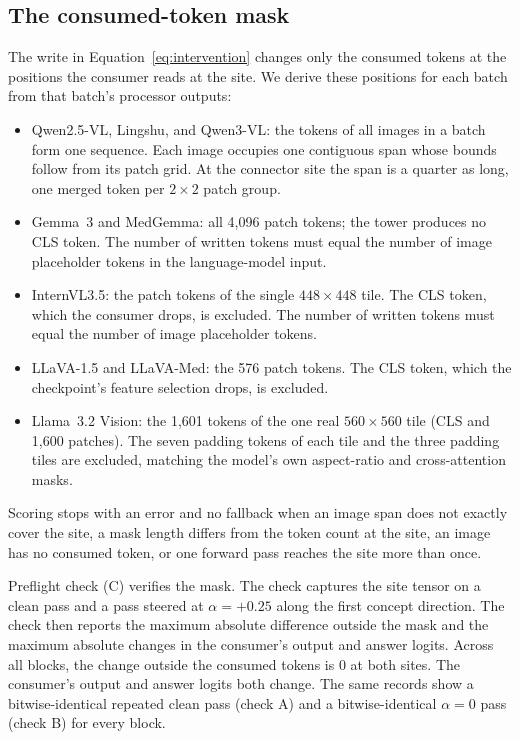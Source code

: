 \subsection{The consumed-token mask}
\label{app:repro-mask}

The write in Equation~\ref{eq:intervention} changes only the consumed tokens at the positions the consumer reads at the site. We derive these positions for each batch from that batch's processor outputs:

\begin{itemize}[leftmargin=*,itemsep=1pt,topsep=2pt]
\item Qwen2.5-VL, Lingshu, and Qwen3-VL: the tokens of all images in a batch form one sequence. Each image occupies one contiguous span whose bounds follow from its patch grid. At the connector site the span is a quarter as long, one merged token per $2\times2$ patch group.
\item Gemma~3 and MedGemma: all 4{,}096 patch tokens; the tower produces no CLS token. The number of written tokens must equal the number of image placeholder tokens in the language-model input.
\item InternVL3.5: the patch tokens of the single $448\times448$ tile. The CLS token, which the consumer drops, is excluded. The number of written tokens must equal the number of image placeholder tokens.
\item LLaVA-1.5 and LLaVA-Med: the 576 patch tokens. The CLS token, which the checkpoint's feature selection drops, is excluded.
\item Llama~3.2 Vision: the 1{,}601 tokens of the one real $560\times560$ tile (CLS and 1{,}600 patches). The seven padding tokens of each tile and the three padding tiles are excluded, matching the model's own aspect-ratio and cross-attention masks.
\end{itemize}

Scoring stops with an error and no fallback when an image span does not exactly cover the site, a mask length differs from the token count at the site, an image has no consumed token, or one forward pass reaches the site more than once.

Preflight check (C) verifies the mask. The check captures the site tensor on a clean pass and a pass steered at $\alpha=+0.25$ along the first concept direction. The check then reports the maximum absolute difference outside the mask and the maximum absolute changes in the consumer's output and answer logits. Across all \cfBlocks{} blocks, the change outside the consumed tokens is $0$ at both sites. The consumer's output and answer logits both change. The same records show a bitwise-identical repeated clean pass (check A) and a bitwise-identical $\alpha=0$ pass (check B) for every block.


